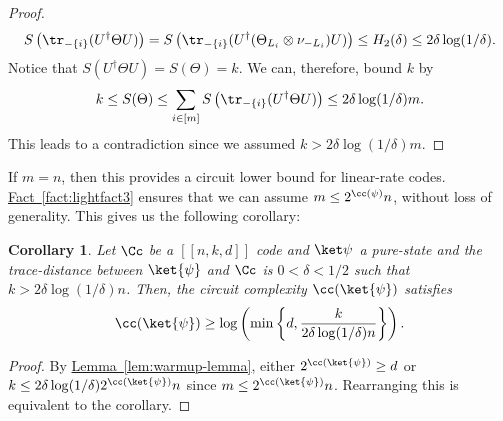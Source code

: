 \documentclass[11pt]{article}
\newcommand{\expref}[2]{\texorpdfstring{\hyperref[#2]{#1~\ref{#2}}}{#1~\ref{#2}}}
\newtheorem{corollary}[theorem]{Corollary}
\begin{document}
\begin{proof}
\begin{align}
    S \left( \tr_{-\{i\}}(U^\dagger \Theta U)  \right) = S \left( \tr_{-\{i\}}(U^\dagger (\Theta_{L_i}\otimes \nu_{-L_i}) U)  \right) \leq H_2(\delta) \leq 2 \delta \log(1/\delta).
\end{align}
Notice that $S(U^\dagger \Theta U)=S(\Theta) = k$. We can, therefore, bound $k$ by 
\begin{align}
    k \leq S(\Theta) \leq \sum_{i \in [m]} S \left( \tr_{-\{i\}}(U^\dagger \Theta U)  \right) \leq 2 \delta \log(1/\delta) m.
\end{align}
This leads to a contradiction since we assumed $k > 2\delta \log(1/\delta) m$.
\end{proof}

If $m = n$, then this provides a circuit lower bound for linear-rate codes. \expref{Fact}{fact:lightfact3} ensures that we can assume $m \leq 2^{\cc(\psi)} n$, without loss of generality. 
This gives us the following corollary:


\begin{corollary}
\label{cor:lin-rate-and-pure}
Let $\Cc$ be a $[[n,k,d]]$ code and $\ket \psi$ a pure-state and the trace-distance between $\ket{\psi}$ and $\Cc$ is $0 < \delta < 1/2$ such that $k > 2 \delta \log(1/\delta) n$. Then, the circuit complexity $\cc(\ket{\psi})$ satisfies
\begin{align}
    \cc(\ket{\psi}) \geq \log \left( \min \left\{ d, \frac{k}{2 \delta \log(1/\delta) n} \right\} \right).
\end{align}
\end{corollary}

\begin{proof}
By \expref{Lemma}{lem:warmup-lemma}, either $2^{\cc(\ket{\psi})} \geq d$ or $k \leq 2 \delta \log(1/\delta) 2^{\cc(\ket{\psi})} n$ since $m \leq 2^{\cc(\ket{\psi})} n$. Rearranging this is equivalent to the corollary.
\end{proof}
\end{document}
